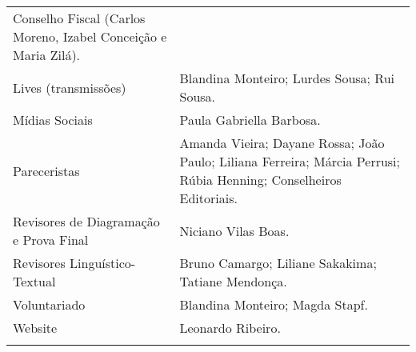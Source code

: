\begin{longtable}[]{@{}
  >{\raggedright\arraybackslash}p{}
  >{\raggedright\arraybackslash}p{}@{}}
\begin{minipage}[b]{\linewidth}
Conselho Fiscal (Carlos Moreno, Izabel Conceição e Maria Zilá).
\end{minipage} \\
\begin{minipage}[b]{\linewidth}\raggedright
Lives (transmissões)
\end{minipage} & \begin{minipage}[b]{\linewidth}\raggedright
Blandina Monteiro; Lurdes Sousa; Rui Sousa.
\end{minipage} \\
\begin{minipage}[b]{\linewidth}\raggedright
Mídias Sociais
\end{minipage} & \begin{minipage}[b]{\linewidth}\raggedright
Paula Gabriella Barbosa.
\end{minipage} \\
\begin{minipage}[b]{\linewidth}\raggedright
Pareceristas
\end{minipage} & \begin{minipage}[b]{\linewidth}\raggedright
Amanda Vieira; Dayane Rossa; João Paulo; Liliana Ferreira; Márcia Perrusi; Rúbia Henning; Conselheiros Editoriais.
\end{minipage} \\
\begin{minipage}[b]{\linewidth}\raggedright
Revisores de Diagramação e Prova Final
\end{minipage} & \begin{minipage}[b]{\linewidth}\raggedright
Niciano Vilas Boas.
\end{minipage} \\
\begin{minipage}[b]{\linewidth}\raggedright
Revisores Linguístico-Textual
\end{minipage} & \begin{minipage}[b]{\linewidth}\raggedright
Bruno Camargo; Liliane Sakakima; Tatiane Mendonça.
\end{minipage} \\
\begin{minipage}[b]{\linewidth}\raggedright
Voluntariado
\end{minipage} & \begin{minipage}[b]{\linewidth}\raggedright
Blandina Monteiro; Magda Stapf.
\end{minipage} \\
\begin{minipage}[b]{\linewidth}\raggedright
Website
\end{minipage} & \begin{minipage}[b]{\linewidth}\raggedright
Leonardo Ribeiro.
\end{minipage} \\
\midrule\noalign{}
\endhead
\bottomrule\noalign{}
\endlastfoot
\end{longtable}

